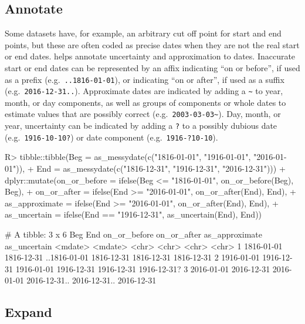 \documentclass[
]{jss}
\begin{document}
\hypertarget{annotate}{%
\subsection{Annotate}\label{annotate}}

Some datasets have, for example, an arbitrary cut off point for start
and end points, but these are often coded as precise dates when they are
not the real start or end dates.  helps annotate
uncertainty and approximation to dates. Inaccurate start or end dates
can be represented by an affix indicating ``on or before'', if used as a
prefix (e.g.~\texttt{..1816-01-01}), or indicating ``on or after'', if
used as a suffix (e.g.~\texttt{2016-12-31..}). Approximate dates are
indicated by adding a \texttt{\textasciitilde{}} to year, month, or day
components, as well as groups of components or whole dates to estimate
values that are possibly correct
(e.g.~\texttt{2003-03-03\textasciitilde{}}). Day, month, or year,
uncertainty can be indicated by adding a \texttt{?} to a possibly
dubious date (e.g.~\texttt{1916-10-10?}) or date component
(e.g.~\texttt{1916-?10-10}).

\begin{CodeChunk}
\begin{CodeInput}
R> tibble::tibble(Beg = as_messydate(c("1816-01-01", "1916-01-01", "2016-01-01")),
+                End = as_messydate(c("1816-12-31", "1916-12-31", "2016-12-31"))) %
+   dplyr::mutate(on_or_before = ifelse(Beg <= "1816-01-01", on_or_before(Beg), Beg),
+                 on_or_after = ifelse(End >= "2016-01-01", on_or_after(End), End),
+                 as_approximate = ifelse(End >= "2016-01-01", on_or_after(End), End),
+                 as_uncertain = ifelse(End == "1916-12-31", as_uncertain(End), End))
\end{CodeInput}
\begin{CodeOutput}
# A tibble: 3 x 6
  Beg        End        on_or_before on_or_after  as_approximate as_uncertain
  <mdate>    <mdate>    <chr>        <chr>        <chr>          <chr>       
1 1816-01-01 1816-12-31 ..1816-01-01 1816-12-31   1816-12-31     1816-12-31  
2 1916-01-01 1916-12-31 1916-01-01   1916-12-31   1916-12-31     1916-12-31? 
3 2016-01-01 2016-12-31 2016-01-01   2016-12-31.. 2016-12-31..   2016-12-31  
\end{CodeOutput}
\end{CodeChunk}

\hypertarget{expand}{%
\subsection{Expand}\label{expand}}
\end{document}
